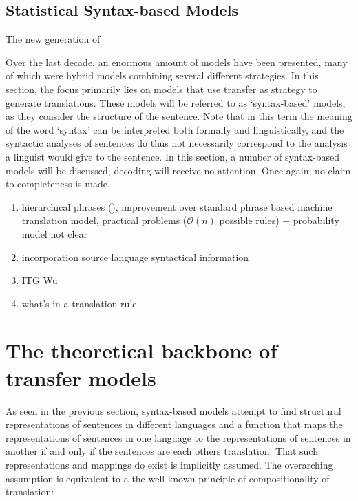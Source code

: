 \documentclass{report}
\theoremstyle{definition}
\theoremstyle{plain}
\begin{document}
\subsection{Statistical Syntax-based Models}

The new generation of 

Over the last decade, an enormous amount of models have been presented, many of which were hybrid models combining several different strategies. In this section, the focus primarily lies on models that use transfer as strategy to generate translations. These models will be referred to as `syntax-based' models, as they consider the structure of the sentence. Note that in this term the meaning of the word `syntax' can be interpreted both formally and linguistically, and the syntactic analyses of sentences do thus not necessarily correspond to the analysis a linguist would give to the sentence. In this section, a number of syntax-based models will be discussed, decoding will receive no attention. Once again, no claim to completeness is made. 



\begin{enumerate}
\item hierarchical phrases (\cite{chiang2005hierarchical}), improvement over standard phrase based machine translation model, practical problems ($\mathcal{O}(n)$ possible rules) + probability model not clear
\item incorporation source language syntactical information
\item ITG Wu
\item what's in a translation rule \cite{galley2004s}
\end{enumerate}

\section{The theoretical backbone of transfer models}

As seen in the previous section, syntax-based models attempt to find structural representations of sentences in different languages and a function that maps the representations of sentences in one language to the representations of sentences in another if and only if the sentences are each others translation. That such representations and mappings do exist is implicitly assumed. The overarching assumption is equivalent to a the well known principle of compositionality of translation:
\end{document}
